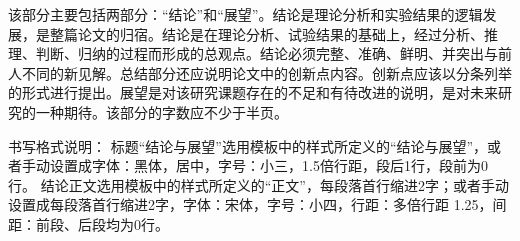 


该部分主要包括两部分：“结论”和“展望”。结论是理论分析和实验结果的逻辑发展，是整篇论文的归宿。结论是在理论分析、试验结果的基础上，经过分析、推理、判断、归纳的过程而形成的总观点。结论必须完整、准确、鲜明、并突出与前人不同的新见解。总结部分还应说明论文中的创新点内容。创新点应该以分条列举的形式进行提出。展望是对该研究课题存在的不足和有待改进的说明，是对未来研究的一种期待。该部分的字数应不少于半页。

书写格式说明：
标题“结论与展望”选用模板中的样式所定义的“结论与展望”，或者手动设置成字体：黑体，居中，字号：小三，1.5倍行距，段后1行，段前为0行。
结论正文选用模板中的样式所定义的“正文”，每段落首行缩进2字；或者手动设置成每段落首行缩进2字，字体：宋体，字号：小四，行距：多倍行距 1.25，间距：前段、后段均为0行。
